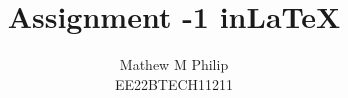 \documentclass[journal,12pt,twocolumn]{IEEEtran}
\begin{document}
\let\vec\mathbf




\vspace{3cm}

\title{
Assignment -1  in\LaTeX
}
\author{ Mathew M Philip \\
	EE22BTECH11211
	
}	


%
%
%

% 
%
\end{document}
